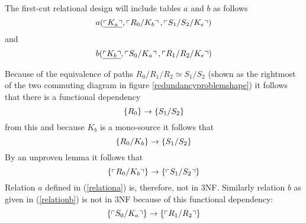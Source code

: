 The first-cut relational design will include tables $a$ and $b$ as follows
\begin{equation}
\label{relationa}
a(\underline{\left\ulcorner K_a\right\urcorner},\left\ulcorner R_0/K_b\right\urcorner,\left\ulcorner S_1/S_2/K_e\right\urcorner)
\end{equation}
and
\begin{equation}
\label{relationb}
b(\underline{\left\ulcorner K_b\right\urcorner},\left\ulcorner S_0/K_a\right\urcorner,\left\ulcorner R_1/R_2/K_e\right\urcorner)
\end{equation}

Because of the equivalence of paths $R_0/R_1/R_2 \simeq S_1/S_2$ (shown as the rightmost of the two
commuting diagram in figure \ref{redundancyproblemshape}) it follows that 
there is a functional dependency
\begin{equation}
\left\{R_0\right\} \rightarrow \left\{S_1/S_2\right\}
\end{equation}
from this and because $K_b$ is a mono-source it follows that
\begin{equation}
\left\{R_0/K_b\right\} \rightarrow \left\{S_1/S_2\right\}
\end{equation}
By an unproven lemma it follows that 
\begin{equation}
\left\{\left\ulcorner R_0/K_b\right\urcorner\right\} \rightarrow \left\{\left\ulcorner S_1/S_2\right\urcorner\right\}
\end{equation}
Relation $a$ defined in (\ref{relationa}) is, therefore, not in 3NF. Similarly relation $b$ as given in
(\ref{relationb}) is not in 3NF because of this functional dependency:
\begin{equation}
\left\{\left\ulcorner S_0/K_a\right\urcorner\right\} \rightarrow \left\{\left\ulcorner R_1/R_2\right\urcorner\right\}
\end{equation}

